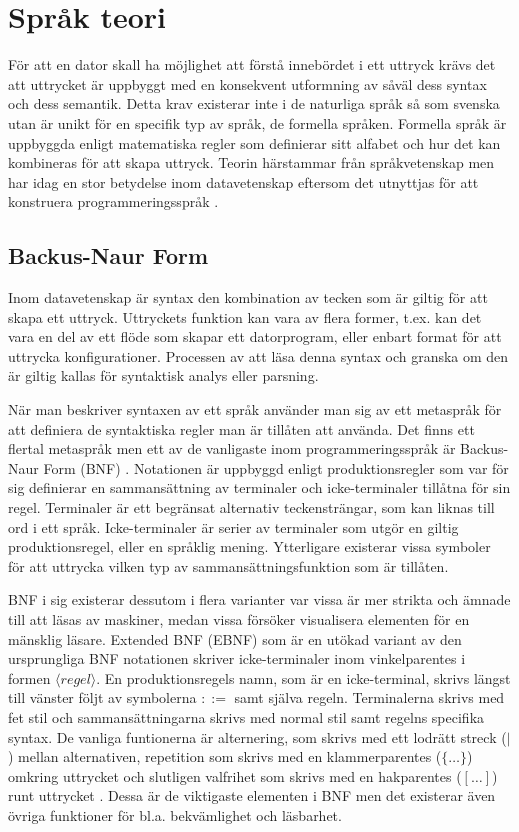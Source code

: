 \section{Språk teori}

För att en dator skall ha möjlighet att förstå innebördet i ett uttryck krävs
det att uttrycket är uppbyggt med en konsekvent utformning av såväl dess
syntax och dess semantik. Detta krav existerar inte i de naturliga språk så
som svenska utan är unikt för en specifik typ av språk, de formella språken.
Formella språk är uppbyggda enligt matematiska regler som definierar sitt
alfabet och hur det kan kombineras för att skapa uttryck. Teorin härstammar
från språkvetenskap men har idag en stor betydelse inom datavetenskap eftersom
det utnyttjas för att konstruera programmeringsspråk \citep[s. 41]{sm09}.

\subsection{Backus-Naur Form}

Inom datavetenskap är syntax den kombination av tecken som är giltig för att
skapa ett uttryck. Uttryckets funktion kan vara av flera former, t.ex. kan det
vara en del av ett flöde som skapar ett datorprogram, eller enbart format för
att uttrycka konfigurationer. Processen av att läsa denna syntax och granska
om den är giltig kallas för syntaktisk analys eller parsning.

När man beskriver syntaxen av ett språk använder man sig av ett metaspråk för
att definiera de syntaktiska regler man är tillåten att använda. Det finns ett
flertal metaspråk men ett av de vanligaste inom programmeringsspråk är
Backus-Naur Form (BNF) \citep[s. 27]{gd08}. Notationen är
uppbyggd enligt produktionsregler som var för sig definierar en sammansättning
av terminaler och icke-terminaler tillåtna för sin regel. Terminaler är ett
begränsat alternativ teckensträngar, som kan liknas till ord i ett språk.
Icke-terminaler är serier av terminaler som utgör en giltig produktionsregel,
eller en språklig mening. Ytterligare existerar vissa symboler för att
uttrycka vilken typ av sammansättningsfunktion som är tillåten.

BNF i sig existerar dessutom i flera varianter var vissa är mer strikta och ämnade till att
läsas av maskiner, medan vissa försöker visualisera elementen för en mänsklig
läsare. Extended BNF (EBNF) som är en utökad variant av den ursprungliga BNF
notationen skriver icke-terminaler inom vinkelparentes i formen
${\langle}regel{\rangle}$. En produktionsregels namn, som är en icke-terminal,
skrivs längst till vänster följt av symbolerna $::=$ samt själva regeln.
Terminalerna skrivs med fet stil och sammansättningarna skrivs med normal
stil samt regelns specifika syntax. De vanliga funtionerna är alternering, som
skrivs med ett lodrätt streck ($|$) mellan alternativen, repetition som skrivs
med en klammerparentes ($\{ \ldots \}$) omkring uttrycket och slutligen
valfrihet som skrivs med en hakparentes ($[ \ldots ]$) runt uttrycket
\citep[s. 28]{gd08}. Dessa är de viktigaste elementen i BNF men det existerar
även övriga funktioner för bl.a. bekvämlighet och läsbarhet.

